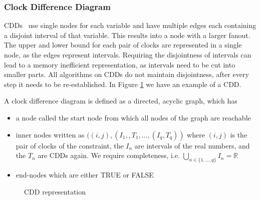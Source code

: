 \subsubsection{Clock Difference Diagram}
CDDs~\cite{BRICS19491} use single nodes for each variable and have multiple edges each containing a disjoint interval of that variable. This results into a node with a larger fanout. The upper and lower bound for each pair of clocks are represented in a single node, as the edges represent intervals. Requiring the disjointness of intervals can lead to a memory inefficient representation, as intervals need to be cut into smaller parts. All algorithms on CDDs do not maintain disjointness, after every step it needs to be re-established. In Figure \ref{fig:cdd-example} we have an example of a CDD.

\begin{mydef}
A clock difference diagram is defined as a directed, acyclic graph, which has
\begin{itemize}
\item a node called the start node from which all nodes of the graph are reachable
\item inner nodes written as $((i,j),(I_1,,T_1,...,(I_q,T_q))$ where $(i,j)$ is the pair of clocks of the constraint, the $I_n$ are intervals of the real numbers, and the $T_n$ are CDDs again. We require completeness, i.e. $\bigcup_{n\in \{1,...,q\}}I_n= \mathbb{R}$
\item end-nodes which are either TRUE or FALSE
\end{itemize}

\end{mydef}

\begin{figure}[h]
\begin{center}
\end{center}
\caption{CDD representation}
\label{fig:cdd-example}
\end{figure}

